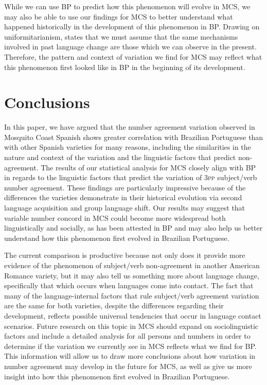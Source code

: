 \documentclass[output=paper,colorlinks,citecolor=brown,
]{langscibook}
\begin{document}
While we can use BP to predict how this phenomenon will evolve in MCS, we may also be able to use our findings for MCS to better understand what happened historically in the development of this phenomenon in BP. Drawing on uniformitarianism, \citet[161]{labov1972sociolinguistic}  states that we must assume that the same mechanisms involved in past language change are those which we can observe in the present. Therefore, the pattern and context of variation we find for MCS may reflect what this phenomenon first looked like in BP in the beginning of its development.

\section{Conclusions}

In this paper, we have argued that the number agreement variation observed in Mosquito Coast Spanish shows greater correlation with Brazilian Portuguese than with other Spanish varieties for many reasons, including the similarities in the nature and context of the variation and the linguistic factors that predict non-agreement. The results of our statistical analysis for MCS closely align with BP in regards to the linguistic factors that predict the variation of \textsc{3pp} subject/verb number agreement. These findings are particularly impressive because of the differences the varieties demonstrate in their historical evolution via second language acquisition and group language shift. Our results may suggest that variable number concord in MCS could become more widespread both linguistically and socially, as has been attested in BP and may also help us better understand how this phenomenon first evolved in Brazilian Portuguese. 

The current comparison is productive because not only does it provide more evidence of the phenomenon of subject/verb non-agreement in another American Romance variety, but it may also tell us something more about language change, specifically that which occurs when languages come into contact. The fact that many of the language-internal factors that rule subject/verb agreement variation are the same for both varieties, despite the differences regarding their development, reflects possible universal tendencies that occur in language contact scenarios. Future research on this topic in MCS should expand on sociolinguistic factors and include a detailed analysis for all persons and numbers in order to determine if the variation we currently see in MCS reflects what we find for BP. This information will allow us to draw more conclusions about how variation in number agreement may develop in the future for MCS, as well as give us more insight into how this phenomenon first evolved in Brazilian Portuguese.
\end{document}
